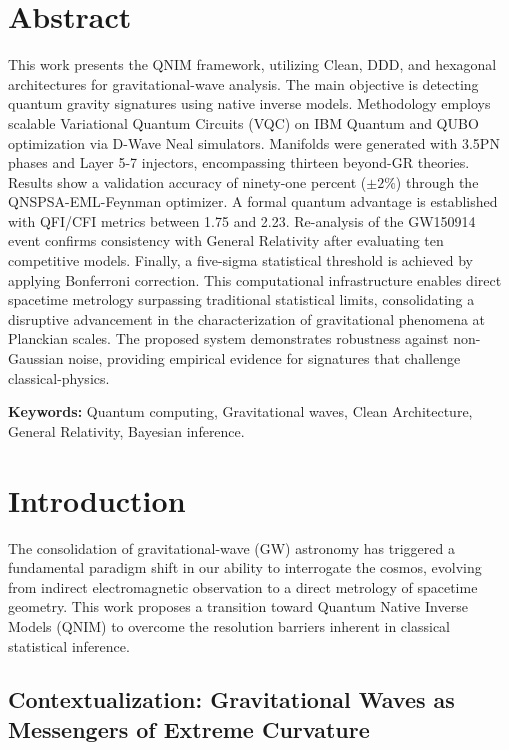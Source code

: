 \documentclass[11pt,a4paper,spanish]{book}
\numberwithin{equation}{chapter}
\numberwithin{figure}{chapter}
\numberwithin{equation}{chapter}
\numberwithin{figure}{chapter}
\numberwithin{table}{chapter}
\begin{document}
\chapter*{Abstract}

This work presents the QNIM framework, utilizing Clean, DDD, and hexagonal architectures for gravitational-wave analysis. The main objective is detecting quantum gravity signatures using native inverse models. Methodology employs scalable Variational Quantum Circuits (VQC) on IBM Quantum and QUBO optimization via D-Wave Neal simulators. Manifolds were generated with 3.5PN phases and Layer 5-7 injectors, encompassing thirteen beyond-GR theories. Results show a validation accuracy of ninety-one percent ($\pm2\%$) through the QNSPSA-EML-Feynman optimizer. A formal quantum advantage is established with QFI/CFI metrics between 1.75 and 2.23. Re-analysis of the GW150914 event confirms consistency with General Relativity after evaluating ten competitive models. Finally, a five-sigma statistical threshold is achieved by applying Bonferroni correction. This computational infrastructure enables direct spacetime metrology surpassing traditional statistical limits, consolidating a disruptive advancement in the characterization of gravitational phenomena at Planckian scales. The proposed system demonstrates robustness against non-Gaussian noise, providing empirical evidence for signatures that challenge classical-physics.

\vspace{0.5cm}
\textbf{Keywords:} Quantum computing, Gravitational waves, Clean Architecture, General Relativity, Bayesian inference.



\mainmatter
\chapter{Introduction}
\label{chap:introduction}

The consolidation of gravitational-wave (GW) astronomy has triggered a fundamental paradigm shift in our ability to interrogate the cosmos, evolving from indirect electromagnetic observation to a direct metrology of spacetime geometry. This work proposes a transition toward Quantum Native Inverse Models (QNIM) to overcome the resolution barriers inherent in classical statistical inference.

\section{Contextualization: Gravitational Waves as Messengers of Extreme Curvature}
\end{document}

